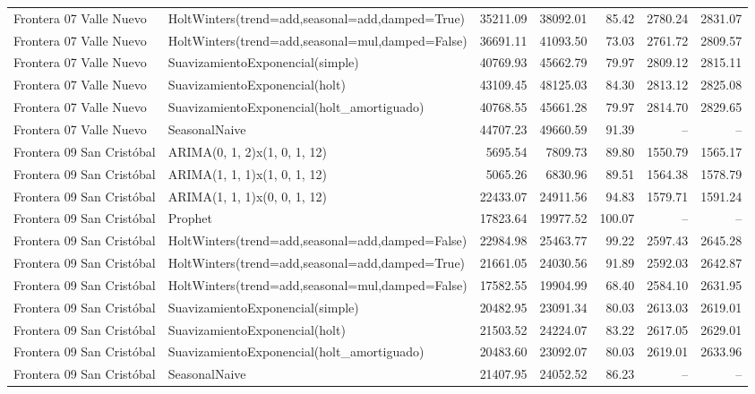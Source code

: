 \begin{table}[H]
{\begin{tabular}{llrrrrr}
Frontera 07 Valle Nuevo & HoltWinters(trend=add,seasonal=add,damped=True) & 35211.09 & 38092.01 & 85.42 & 2780.24 & 2831.07 \\
Frontera 07 Valle Nuevo & HoltWinters(trend=add,seasonal=mul,damped=False) & 36691.11 & 41093.50 & 73.03 & 2761.72 & 2809.57 \\
Frontera 07 Valle Nuevo & SuavizamientoExponencial(simple) & 40769.93 & 45662.79 & 79.97 & 2809.12 & 2815.11 \\
Frontera 07 Valle Nuevo & SuavizamientoExponencial(holt) & 43109.45 & 48125.03 & 84.30 & 2813.12 & 2825.08 \\
Frontera 07 Valle Nuevo & SuavizamientoExponencial(holt\_amortiguado) & 40768.55 & 45661.28 & 79.97 & 2814.70 & 2829.65 \\
Frontera 07 Valle Nuevo & SeasonalNaive & 44707.23 & 49660.59 & 91.39 & -- & -- \\
Frontera 09 San Cristóbal & ARIMA(0, 1, 2)x(1, 0, 1, 12) & 5695.54 & 7809.73 & 89.80 & 1550.79 & 1565.17 \\
Frontera 09 San Cristóbal & ARIMA(1, 1, 1)x(1, 0, 1, 12) & 5065.26 & 6830.96 & 89.51 & 1564.38 & 1578.79 \\
Frontera 09 San Cristóbal & ARIMA(1, 1, 1)x(0, 0, 1, 12) & 22433.07 & 24911.56 & 94.83 & 1579.71 & 1591.24 \\
Frontera 09 San Cristóbal & Prophet & 17823.64 & 19977.52 & 100.07 & -- & -- \\
Frontera 09 San Cristóbal & HoltWinters(trend=add,seasonal=add,damped=False) & 22984.98 & 25463.77 & 99.22 & 2597.43 & 2645.28 \\
Frontera 09 San Cristóbal & HoltWinters(trend=add,seasonal=add,damped=True) & 21661.05 & 24030.56 & 91.89 & 2592.03 & 2642.87 \\
Frontera 09 San Cristóbal & HoltWinters(trend=add,seasonal=mul,damped=False) & 17582.55 & 19904.99 & 68.40 & 2584.10 & 2631.95 \\
Frontera 09 San Cristóbal & SuavizamientoExponencial(simple) & 20482.95 & 23091.34 & 80.03 & 2613.03 & 2619.01 \\
Frontera 09 San Cristóbal & SuavizamientoExponencial(holt) & 21503.52 & 24224.07 & 83.22 & 2617.05 & 2629.01 \\
Frontera 09 San Cristóbal & SuavizamientoExponencial(holt\_amortiguado) & 20483.60 & 23092.07 & 80.03 & 2619.01 & 2633.96 \\
Frontera 09 San Cristóbal & SeasonalNaive & 21407.95 & 24052.52 & 86.23 & -- & -- \\
\bottomrule
\end{tabular}
}
\end{table}
